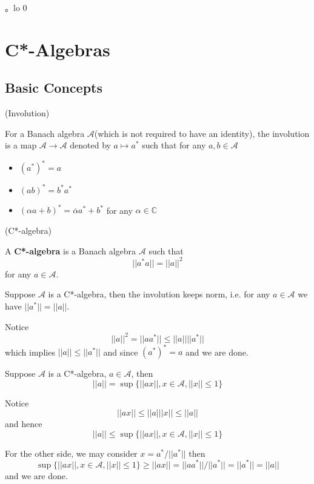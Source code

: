 。lo 0\section{C*-Algebras}

\subsection{Basic Concepts}

\begin{definition}(Involution)\par
    For a Banach algebra $\mathcal{A}$(which is not required to have an identity), the involution is a map $\mathcal{A} \to \mathcal{A}$ denoted by $a\mapsto a^*$ such that for any $a,b\in\mathcal{A}$
    \begin{itemize}
        \item $(a^*)^* = a$
        \item $(ab)^* = b^*a^*$
        \item $(\alpha a + b)^* = \overline{\alpha}a^*+b^*$ for any $\alpha \in \mathbb{C}$
    \end{itemize}
\end{definition}

\begin{definition}(C*-algebra)\par
    A \textbf{C*-algebra} is a Banach algebra $\mathcal{A}$ such that
    \[||a^*a|| = ||a||^2\]
    for any $a\in\mathcal{A}$.    
\end{definition}

\begin{proposition}
    Suppose $\mathcal{A}$ is a C*-algebra, then the involution keeps norm, i.e. for any $a\in \mathcal{A}$ we have $||a^*|| = ||a||$.
\end{proposition}
\Pf\par
    Notice
    \[
    ||a||^2 = ||aa^*|| \leq ||a||||a^*||
    \]
    which implies $||a|| \leq ||a^*||$ and since $(a^*)^* = a$ and we are done.

\begin{proposition}
    Suppose $\mathcal{A}$ is a C*-algebra, $a\in\mathcal{A}$, then
    \[
    ||a|| = \sup\{||ax||, x\in\mathcal{A}, ||x|| \leq 1\}
    \]
\end{proposition}
\Pf\par
    Notice
    \[
    ||ax|| \leq ||a|||x|| \leq ||a||
    \]
    and hence
    \[
    ||a|| \leq \sup\{||ax||, x\in\mathcal{A}, ||x|| \leq 1\}
    \]\par
    For the other side, we may consider $x = a^*/||a^*||$ then
    \[
    \sup\{||ax||, x\in\mathcal{A}, ||x|| \leq 1\} \geq ||ax|| = ||aa^*||/||a^*|| = ||a^*|| = ||a||
    \]
    and we are done.

